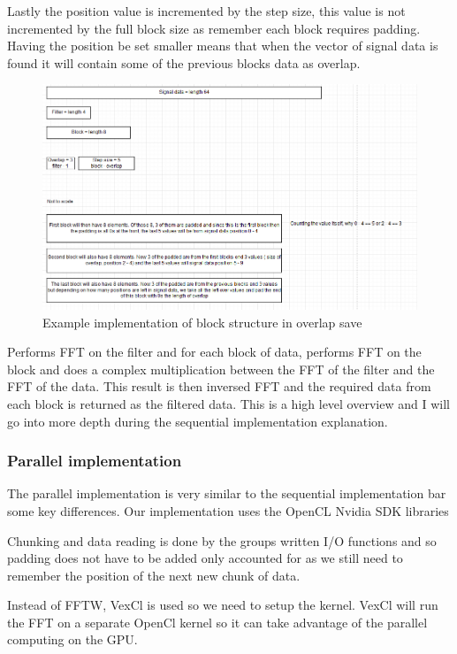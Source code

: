 \documentclass{article}
\begin{document}
Lastly the position value is incremented by the step size, this value is not incremented by the full block size as remember each block requires padding. Having the position be set smaller means that when the vector of signal data is found it will contain some of the previous blocks data as overlap.

\begin{figure}[!htb]
	\includegraphics[width=\linewidth]{example1.png}
	\caption{Example implementation of block structure in overlap save}
	\label{fig:results1}
\end{figure}

Performs FFT on the filter and for each block of data, performs FFT on the block and does a complex multiplication between the FFT of the filter and the FFT of the data. This result is then inversed FFT and the required data from each block is returned as the filtered data. This is a high level overview and I will go into more depth during the sequential implementation explanation.

\subsubsection{Parallel implementation}

The parallel implementation is very similar to the sequential implementation bar some key differences. Our implementation uses the OpenCL Nvidia SDK libraries 

Chunking and data reading is done by the groups written I/O functions and so padding does not have to be added only accounted for as we still need to remember the position of the next new chunk of data.

Instead of FFTW, VexCl is used so we need to setup the kernel. VexCl will run the FFT on a separate OpenCl kernel so it can take advantage of the parallel computing on the GPU.
\end{document}
